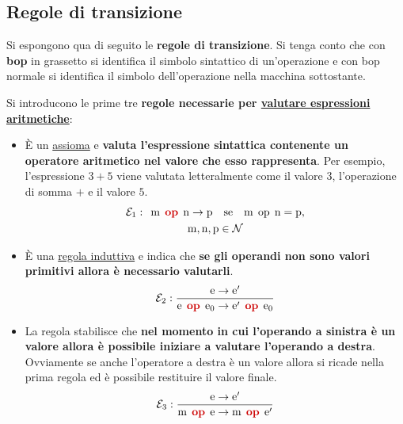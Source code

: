 \documentclass[a4paper]{article}
\begin{document}
	\subsection{Regole di transizione}\label{regole di transizione}
	
	Si espongono qua di seguito le \textcolor{Red3}{\textbf{regole di transizione}}. Si tenga conto che con \textbf{bop} in grassetto si identifica il simbolo sintattico di un'operazione e con bop normale si identifica il simbolo dell'operazione nella macchina sottostante.\newline
	
	\noindent
	Si introducono le prime tre \textbf{regole necessarie per \underline{valutare espressioni aritmetiche}}:
	\begin{itemize}
		\item È un \underline{assioma} e \textbf{valuta l'espressione sintattica contenente un operatore aritmetico nel valore che esso rappresenta}. Per esempio, l'espressione $3+5$ viene valutata letteralmente come il valore $3$, l'operazione di somma $+$ e il valore $5$.
		\begin{gather*}
			\mathcal{E}_{1}: \:\: \mathrm{m} \:\: \textcolor{Red3}{\mathbf{op}} \:\: \mathrm{n} \rightarrow \mathrm{p} \hspace{1em} \mathrm{se} \hspace{1em} \mathrm{m} \:\: \mathrm{op} \:\: \mathrm{n} = \mathrm{p}, \\
			\mathrm{m,n,p} \in \mathcal{N}
		\end{gather*}
		
		\item È una \underline{regola induttiva} e indica che \textbf{se gli operandi non sono valori primitivi allora è necessario valutarli}.
		\begin{equation*}
			\mathcal{E}_{2}: \dfrac{
			\mathrm{e} \rightarrow \mathrm{e}'
			}{
			\mathrm{e} \:\: \textcolor{Red3}{\mathbf{op}} \:\: \mathrm{e}_{0} \rightarrow \mathrm{e}' \:\: \textcolor{Red3}{\mathbf{op}} \:\: \mathrm{e}_{0}
			}
		\end{equation*}
		
		\item La regola stabilisce che \textbf{nel momento in cui l'operando a sinistra è un valore allora è possibile iniziare a valutare l'operando a destra}. Ovviamente se anche l'operatore a destra è un valore allora si ricade nella prima regola ed è possibile restituire il valore finale.
		\begin{equation*}
			\mathcal{E}_{3} : \dfrac{
				\mathrm{e} \rightarrow \mathrm{e}'
			}{
				\mathrm{m} \:\: \textcolor{Red3}{\mathbf{op}} \:\: \mathrm{e} \rightarrow \mathrm{m} \:\: \textcolor{Red3}{\mathbf{op}} \:\: \mathrm{e}'
			}
		\end{equation*}
	\end{itemize}\newpage
	
\end{document}

